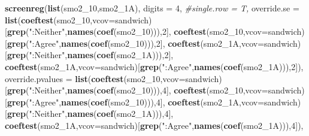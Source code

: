 \documentclass[
]{article}
\newenvironment{Shaded}{\begin{snugshade}}{\end{snugshade}}
\newcommand{\CommentTok}[1]{\textcolor[rgb]{0.56,0.35,0.01}{\textit{#1}}}
\newcommand{\DataTypeTok}[1]{\textcolor[rgb]{0.13,0.29,0.53}{#1}}
\newcommand{\DecValTok}[1]{\textcolor[rgb]{0.00,0.00,0.81}{#1}}
\newcommand{\KeywordTok}[1]{\textcolor[rgb]{0.13,0.29,0.53}{\textbf{#1}}}
\newcommand{\NormalTok}[1]{#1}
\newcommand{\StringTok}[1]{\textcolor[rgb]{0.31,0.60,0.02}{#1}}
\begin{document}
\begin{Shaded}
\begin{Highlighting}[]
\KeywordTok{screenreg}\NormalTok{(}\KeywordTok{list}\NormalTok{(smo2_}\DecValTok{10}\NormalTok{,smo2_1A), }\DataTypeTok{digits =} \DecValTok{4}\NormalTok{, }\CommentTok{#single.row = T,}
          \DataTypeTok{override.se =} \KeywordTok{list}\NormalTok{(}\KeywordTok{coeftest}\NormalTok{(smo2_}\DecValTok{10}\NormalTok{,}\DataTypeTok{vcov=}\NormalTok{sandwich)[}\KeywordTok{grep}\NormalTok{(}\StringTok{":Neither"}\NormalTok{,}\KeywordTok{names}\NormalTok{(}\KeywordTok{coef}\NormalTok{(smo2_}\DecValTok{10}\NormalTok{))),}\DecValTok{2}\NormalTok{],}
                             \KeywordTok{coeftest}\NormalTok{(smo2_}\DecValTok{10}\NormalTok{,}\DataTypeTok{vcov=}\NormalTok{sandwich)[}\KeywordTok{grep}\NormalTok{(}\StringTok{":Agree"}\NormalTok{,}\KeywordTok{names}\NormalTok{(}\KeywordTok{coef}\NormalTok{(smo2_}\DecValTok{10}\NormalTok{))),}\DecValTok{2}\NormalTok{],}
                             \KeywordTok{coeftest}\NormalTok{(smo2_1A,}\DataTypeTok{vcov=}\NormalTok{sandwich)[}\KeywordTok{grep}\NormalTok{(}\StringTok{":Neither"}\NormalTok{,}\KeywordTok{names}\NormalTok{(}\KeywordTok{coef}\NormalTok{(smo2_1A))),}\DecValTok{2}\NormalTok{],}
                             \KeywordTok{coeftest}\NormalTok{(smo2_1A,}\DataTypeTok{vcov=}\NormalTok{sandwich)[}\KeywordTok{grep}\NormalTok{(}\StringTok{":Agree"}\NormalTok{,}\KeywordTok{names}\NormalTok{(}\KeywordTok{coef}\NormalTok{(smo2_1A))),}\DecValTok{2}\NormalTok{]),}
          \DataTypeTok{override.pvalues =} \KeywordTok{list}\NormalTok{(}\KeywordTok{coeftest}\NormalTok{(smo2_}\DecValTok{10}\NormalTok{,}\DataTypeTok{vcov=}\NormalTok{sandwich)[}\KeywordTok{grep}\NormalTok{(}\StringTok{":Neither"}\NormalTok{,}\KeywordTok{names}\NormalTok{(}\KeywordTok{coef}\NormalTok{(smo2_}\DecValTok{10}\NormalTok{))),}\DecValTok{4}\NormalTok{],}
                                  \KeywordTok{coeftest}\NormalTok{(smo2_}\DecValTok{10}\NormalTok{,}\DataTypeTok{vcov=}\NormalTok{sandwich)[}\KeywordTok{grep}\NormalTok{(}\StringTok{":Agree"}\NormalTok{,}\KeywordTok{names}\NormalTok{(}\KeywordTok{coef}\NormalTok{(smo2_}\DecValTok{10}\NormalTok{))),}\DecValTok{4}\NormalTok{],}
                                  \KeywordTok{coeftest}\NormalTok{(smo2_1A,}\DataTypeTok{vcov=}\NormalTok{sandwich)[}\KeywordTok{grep}\NormalTok{(}\StringTok{":Neither"}\NormalTok{,}\KeywordTok{names}\NormalTok{(}\KeywordTok{coef}\NormalTok{(smo2_1A))),}\DecValTok{4}\NormalTok{],}
                                  \KeywordTok{coeftest}\NormalTok{(smo2_1A,}\DataTypeTok{vcov=}\NormalTok{sandwich)[}\KeywordTok{grep}\NormalTok{(}\StringTok{":Agree"}\NormalTok{,}\KeywordTok{names}\NormalTok{(}\KeywordTok{coef}\NormalTok{(smo2_1A))),}\DecValTok{4}\NormalTok{]),}

\end{Highlighting}
\end{Shaded}
\end{document}
